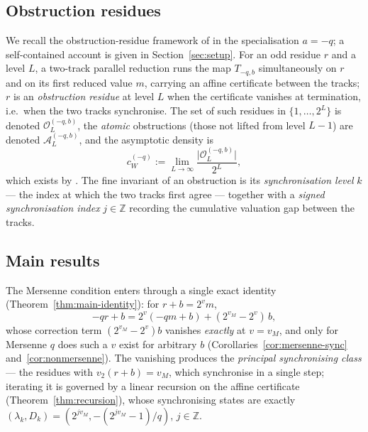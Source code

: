 \documentclass[11pt,reqno]{amsart}
\theoremstyle{plain}
\theoremstyle{definition}
\theoremstyle{remark}
\newcommand{\Tnegq}{T_{-q,b}}
\newcommand{\Z}{\mathbb{Z}}
\newcommand{\Obs}{\mathcal{O}}
\newcommand{\Atom}{\mathcal{A}}
\newcommand{\vtwo}{v_{2}}
\newcommand{\vM}{v_{M}}
\newcommand{\cWq}{c_{W}^{(-q)}}
\newcommand{\Obsq}{\Obs_{L}^{(-q,b)}}
\newcommand{\Atomq}{\Atom_{L}^{(-q,b)}}
\begin{document}
\subsection{Obstruction residues}

We recall the obstruction-residue framework of
\cite{ObstructionResiduesFamily2026} in the specialisation $a = -q$; a
self-contained account is given in Section~\ref{sec:setup}. For an odd
residue $r$ and a level $L$, a two-track parallel reduction runs the map
$\Tnegq$ simultaneously on $r$ and on its first reduced value $m$, carrying
an affine certificate between the tracks; $r$ is an \emph{obstruction
residue} at level $L$ when the certificate vanishes at termination, i.e.\
when the two tracks synchronise. The set of such residues in
$\{1, \ldots, 2^L\}$ is denoted $\Obsq$, the \emph{atomic} obstructions
(those not lifted from level $L-1$) are denoted $\Atomq$, and the asymptotic
density is
\[
\cWq := \lim_{L \to \infty} \frac{\lvert \Obsq \rvert}{2^L},
\]
which exists by \cite{ObstructionResiduesFamily2026}. The fine invariant of
an obstruction is its \emph{synchronisation level} $k$ --- the index at which
the two tracks first agree --- together with a \emph{signed synchronisation
index} $j \in \Z$ recording the cumulative valuation gap between the tracks.

\subsection{Main results}

The Mersenne condition enters through a single exact identity
(Theorem~\ref{thm:main-identity}): for $r + b = 2^v m$,
\[
-q r + b = 2^v(-q m + b) + (2^{\vM} - 2^v)\, b,
\]
whose correction term $(2^{\vM} - 2^v) b$ vanishes \emph{exactly} at
$v = \vM$, and only for Mersenne $q$ does such a $v$ exist for arbitrary $b$
(Corollaries~\ref{cor:mersenne-sync} and~\ref{cor:nonmersenne}). The
vanishing produces the \emph{principal synchronising class} --- the residues
with $\vtwo(r + b) = \vM$, which synchronise in a single step; iterating it is
governed by a linear recursion on the affine certificate
(Theorem~\ref{thm:recursion}), whose synchronising states are exactly
$(\lambda_k, D_k) = (2^{j\vM}, -(2^{j\vM}-1)/q)$, $j \in \Z$.
\end{document}
